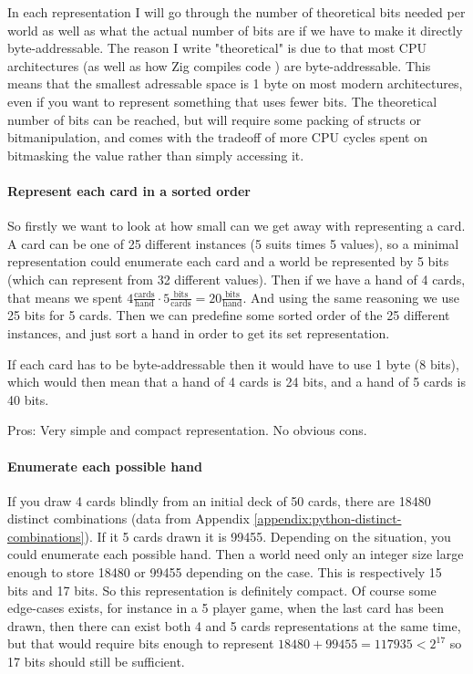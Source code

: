 In each representation I will go through the number of theoretical bits needed per world as well as what the actual number of bits are if we have to make it directly byte-addressable. The reason I write "theoretical" is due to that most CPU architectures (as well as how Zig compiles code \cite{zigdocspackedstruct}) are byte-addressable. This means that the smallest adressable space is 1 byte on most modern architectures, even if you want to represent something that uses fewer bits. The theoretical number of bits can be reached, but will require some packing of structs or bitmanipulation, and comes with the tradeoff of more CPU cycles spent on bitmasking the value rather than simply accessing it. 


\paragraph{Represent each card in a sorted order}
So firstly we want to look at how small can we get away with representing a card. A card can be one of 25 different instances (5 suits times 5 values), so a minimal representation could enumerate each card and a world be represented by 5 bits (which can represent from 32 different values).
Then if we have a hand of 4 cards, that means we spent $4 \frac{\text{cards}}{\text{hand}} \cdot 5 \frac{\text{bits}}{\text{cards}} = 20 \frac{\text{bits}}{\text{hand}}$. And using the same reasoning we use 25 bits for 5 cards.
Then we can predefine some sorted order of the 25 different instances, and just sort a hand in order to get its set representation.

If each card has to be byte-addressable then it would have to use 1 byte (8 bits), which would then mean that a hand of 4 cards is 24 bits, and a hand of 5 cards is 40 bits.

Pros: Very simple and compact representation. No obvious cons.

\paragraph{Enumerate each possible hand}
If you draw 4 cards blindly from an initial deck of 50 cards, there are 18480 distinct combinations (data from Appendix \ref{appendix:python-distinct-combinations}). If it 5 cards drawn it is 99455. 
Depending on the situation, you could enumerate each possible hand. Then a world need only an integer size large enough to store 18480 or 99455 depending on the case. This is respectively 15 bits and 17 bits.
So this representation is definitely compact. Of course some edge-cases exists, for instance in a 5 player game, when the last card has been drawn, then there can exist both 4 and 5 cards representations at the same time, but that would require bits enough to represent $18480+99455 = 117935 < 2^{17}$ so 17 bits should still be sufficient.

